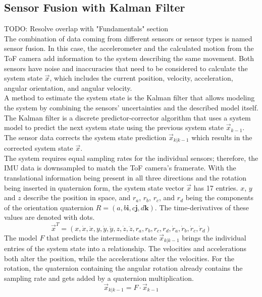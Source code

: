 \subsection{Sensor Fusion with Kalman Filter}
\label{sec:SensorFusion}
TODO: Resolve overlap with "Fundamentals" section\\
The combination of data coming from different sensors or sensor types is named sensor fusion. In this case, the accelerometer and the calculated motion from the ToF camera add information to the system describing the same movement. Both sensors have noise and inaccuracies that need to be considered to calculate the system state $\vec{x}$, which includes the current position, velocity, acceleration, angular orientation, and angular velocity.\\
A method to estimate the system state is the Kalman filter that allows modeling the system by combining the sensors' uncertainties and the described model itself. The Kalman filter is a discrete predictor-corrector algorithm that uses a system model to predict the next system state using the previous system state $\vec{x}_{k-1}$. The sensor data corrects the system state prediction $\vec{x}_{k|k-1}$ which results in the corrected system state $\vec{x}$.\\
The system requires equal sampling rates for the individual sensors; therefore, the IMU data is downsampled to match the ToF camera's framerate.
With the translational information being present in all three directions and the rotation being inserted in quaternion form, the system state vector $\vec{x}$ has 17 entries. $x$, $y$ and $z$ describe the position in space, and $r_{a}$, $r_{b}$, $r_{c}$, and $r_{d}$ being the components of the orientation quaternion $R = (a, b\textbf{i}, c\textbf{j}, d\textbf{k})$. The time-derivatives of these values are denoted with dots.
\begin{equation*}
    \vec{x}^{T} = (
        x, \dot{x}, \ddot{x}, y, \dot{y}, \ddot{y}, z, \dot{z}, \ddot{z}, r_{a}, r_{b}, r_{c}, r_{d}, \dot{r}_{a}, \dot{r}_{b}, \dot{r}_{c}, \dot{r}_{d})
\end{equation*}
The model $F$ that predicts the intermediate state $\vec{x}_{k|k-1}$ brings the individual entries of the system state into a relationship. The velocities and accelerations both alter the position, while the accelerations alter the velocities. For the rotation, the quaternion containing the angular rotation already contains the sampling rate and gets added by a quaternion multiplication. 
\begin{equation*}
    \vec{x}_{k|k-1} = 
    F
    \cdot
    \vec{x}_{k-1}
\end{equation*}
